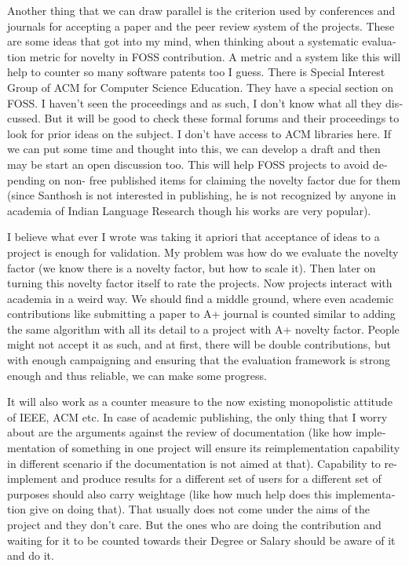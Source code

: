 \begin{english}
Another thing that we can draw parallel is the criterion used
by conferences and journals for accepting a paper and the peer review system
of the projects. These are some ideas that got into my mind, when thinking about a
systematic evaluation metric for novelty in FOSS contribution. A metric
and a system like this will help to counter so many software patents too I guess.
There is Special Interest Group of ACM for Computer Science Education.
They have a special section on FOSS. I haven't seen the proceedings and as such, I
don't know what all they discussed. But it will be good to check these
formal forums and their proceedings to look for prior ideas on the subject.
I don't have access to ACM libraries here. If we can put some time and
thought into this, we can develop a draft and then may be start an open
discussion too. This will help FOSS projects to avoid depending on non-
free published items for claiming the novelty factor due for them (since
Santhosh is not interested in publishing, he is not recognized by anyone
in academia of Indian Language Research though his works are very popular).


I believe what ever I wrote was taking it apriori that acceptance of ideas
to a project is enough for validation. My problem was how do we evaluate
the novelty factor (we know there is a novelty factor, but how to scale it).
Then later on turning this novelty factor itself to rate the projects.
Now projects interact with academia in a weird way. We should find a middle
ground, where even academic contributions like submitting a paper to A+
journal is counted similar to adding the same algorithm with all its detail
to a project with A+ novelty factor. People might not accept it as such,
and at first, there will be double contributions, but with enough campaigning
and ensuring that the evaluation framework is strong enough and thus reliable,
we can make some progress.

It will also work as a counter measure to the now existing
monopolistic attitude of IEEE, ACM etc. In case of academic publishing, the
only thing that I worry about are the arguments against the review of documentation 
(like how implementation of something in one project will ensure its
reimplementation capability in different scenario if the documentation
is not aimed at that). Capability to re-implement and produce results for
a different set of users for a different set of purposes should also carry
weightage (like how much help does this implementation give on doing that).
That usually does not come under the aims of the project and they don't care.
But the ones who are doing the contribution and waiting for it to be counted
towards their Degree or Salary should be aware of it and do it.


\end{english}

